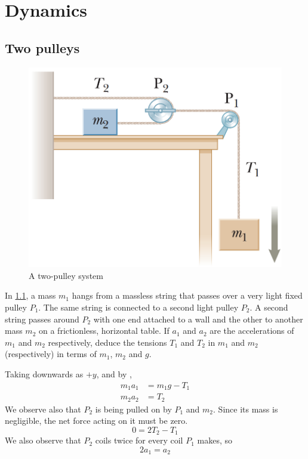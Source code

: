 \chapter{Dynamics}

\section{Two pulleys}
\begin{figure}
  \includegraphics[scale=.35]{assets/twopulleys.png}
  \caption{A two-pulley system}
  \label{fig:twopulleys}
\end{figure}

\begin{problem}
  In \cref{fig:twopulleys}, a mass \(m_1\) hangs from a massless string
  that passes over a very light fixed pulley \(P_1\).
  The same string is connected to a second light pulley \(P_2\). A
  second string passes around \(P_2\) with one end
  attached to a wall and the other to another mass \(m_2\) on a
  frictionless, horizontal table.
  If \(a_1\) and \(a_2\) are the accelerations of \(m_1\) and
  \(m_2\) respectively, deduce the tensions \(T_1\) and \(T_2\) in \(m_1\) and
  \(m_2\) (respectively) in terms of \(m_1\), \(m_2\) and \(g\).
\end{problem}

Taking downwards as \(+y\), and by ,
\begin{align}
  \label{eq:m1a1}
  m_1a_1 &= m_1g-T_1 \\
  m_2a_2 &= T_2
  \label{eq:m2a2}
\end{align}
We observe also that \(P_2\) is being pulled on by \(P_1\) and
\(m_2\). Since its
mass is negligible, the net force acting on it must be zero.
\begin{equation}
  0 = 2T_2 - T_1
  \label{eq:t1t2}
\end{equation}
We also observe that \(P_2\) coils twice for every coil \(P_1\) makes, so
\begin{equation}
  2a_1 = a_2
  \label{eq:a1a2}
\end{equation}

